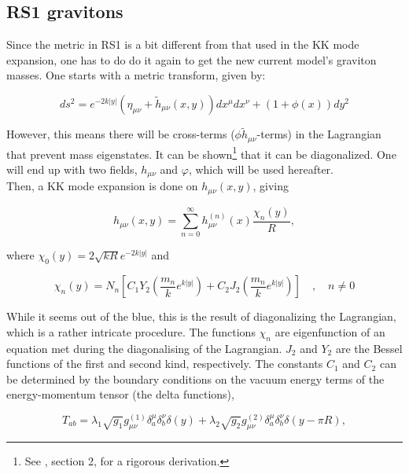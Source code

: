 \documentclass[11pt,a4paper]{article}
\begin{document}
\subsection{RS1 gravitons}
Since the metric in RS1 is a bit different from that used in the KK mode expansion, one has to do do it again to get the new current model's graviton masses. One starts with a metric transform, given by:

\begin{equation}
	ds^2 = e^{-2k|y|}(\eta_{\mu\nu} + \tilde{h}_{\mu\nu}(x,y))dx^\mu dx^\nu + (1+\phi(x))dy^2
\end{equation}

However, this means there will be cross-terms ($\phi \tilde{h}_{\mu\nu}$-terms) in the Lagrangian that prevent mass eigenstates. It can be shown\footnote{See , section 2, for a rigorous derivation.} that it can be diagonalized. One will end up with two fields, $h_{\mu\nu}$ and $\varphi$, which will be used hereafter.\\
Then, a KK mode expansion is done on $h_{\mu\nu}(x,y)$, giving

\begin{equation}
	h_{\mu\nu}(x,y) = \sum_{n=0}^{\infty} h_{\mu\nu}^{(n)}(x)\frac{\chi_n(y)}{R},
\end{equation}

where $\chi_0(y) = 2\sqrt{kR}e^{-2k|y|}$ and

\begin{equation}
	\chi_n(y) = N_n\left[ C_1Y_2\left(\frac{m_n}{k}e^{k|y|}\right) +   C_2J_2\left(\frac{m_n}{k}e^{k|y|}\right)\right] \quad,\quad n\neq 0
\end{equation}

While it seems out of the blue, this is the result of diagonalizing the Lagrangian, which is a rather intricate procedure. The functions $\chi_n$ are eigenfunction of an equation met during the diagonalising of the Lagrangian. $J_2$ and $Y_2$ are the Bessel functions of the first and second kind, respectively. The constants $C_1$ and $C_2$ can be determined by the boundary conditions on the vacuum energy terms of the energy-momentum tensor (the delta functions),

\begin{equation}
	T_{ab} = \lambda_1\sqrt{g_1}g_{\mu\nu}^{(1)}\delta_a^\mu\delta_b^\nu\delta(y) + \lambda_2\sqrt{g_2}g_{\mu\nu}^{(2)}\delta_a^\mu\delta_b^\nu\delta(y-\pi R),
\end{equation}
\end{document}

